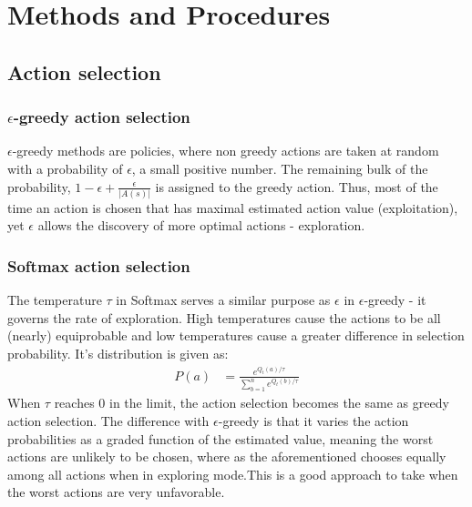 \documentclass[paper=a4, fontsize=11pt]{scrartcl}
\numberwithin{equation}{section}		%
\numberwithin{figure}{section}			%
\numberwithin{table}{section}				%
\begin{document}

\section{Methods and Procedures}
\label{methods}
\subsection{\textbf {Action selection}}
\subsubsection*{$\epsilon$-greedy action selection}
$\epsilon$-greedy methods are policies, where non greedy actions are taken at random with a probability of $\epsilon$, a small positive number. The remaining bulk of the probability, $1-\epsilon + \frac{\epsilon}{|A(s)|}$ is assigned to the greedy action. Thus, most of the time an action is chosen that has maximal estimated action value (exploitation), yet $\epsilon$ allows the discovery of more optimal actions - exploration.

\subsubsection*{Softmax action selection}
The temperature $\tau$ in Softmax serves a similar purpose as $\epsilon$ in $\epsilon$-greedy - it governs the rate of exploration. High temperatures cause the actions to be all (nearly) equiprobable and low temperatures cause a greater difference in selection probability. It's distribution is given as:
\begin{align}
P(a) &= \frac{e^{Q_t(a)/\tau}}{\sum_{b=1}^{n} e^{Q_t(b)/\tau}}
\end{align}
When $\tau$ reaches 0 in the limit, the action selection becomes the same as greedy action selection. The difference with $\epsilon$-greedy is that it varies the action probabilities as a graded function of the estimated value, meaning the worst actions are unlikely to be chosen, where as the aforementioned chooses equally among all actions when in exploring mode.This is a good approach to take when the worst actions are very unfavorable.
\end{document}
